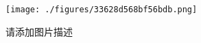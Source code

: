 
\begin{figure}[ht]
\centering
\texttt{[image: ./figures/33628d568bf56bdb.png]}
\caption{请添加图片描述} \label{fig_test37_1}
\end{figure}